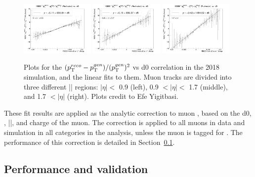\begin{figure}[!htb]
      \centering
      \captionsetup{justification=justified}
      \includegraphics[width=0.32\textwidth]{pics/muon_corr/GeoFit/fit_results/2018_DY_eta_0_0p9_dRelPt2p0_Roch.png}
      \includegraphics[width=0.32\textwidth]{pics/muon_corr/GeoFit/fit_results/2018_DY_eta_0p9_1p7_dRelPt2p0_Roch.png}
      \includegraphics[width=0.32\textwidth]{pics/muon_corr/GeoFit/fit_results/2018_DY_eta_1p7_inf_dRelPt2p0_Roch.png}
      \caption{Plots for the $(p_{\mathrm{T}}^{reco}-p_{\mathrm{T}}^{gen})/ (p_{\mathrm{T}}^{gen})^{2}$ vs d0 correlation in the 2018 \DY simulation, 
               and the linear fits to them. Muon tracks are divided into three different |\eta| regions:
               $|\eta| <$ 0.9 (left), 0.9 $< |\eta| <$ 1.7 (middle), and 1.7 $< |\eta|$ (right).
               Plots credit to Efe Yigitbasi.}
      \label{fig:geofit_param_2018}
\end{figure}

These fit results are applied as the analytic correction to muon \pt, 
based on the d0, \pt, |\eta|, and charge of the muon.
The correction is applied to all muons in data and simulation in all categories in the \hmm analysis, 
unless the muon is tagged for \FSR.
The performance of this correction is detailed in Section~\ref{sec:perf_geofit}.

\subsection{Performance and validation}\label{sec:perf_geofit}

